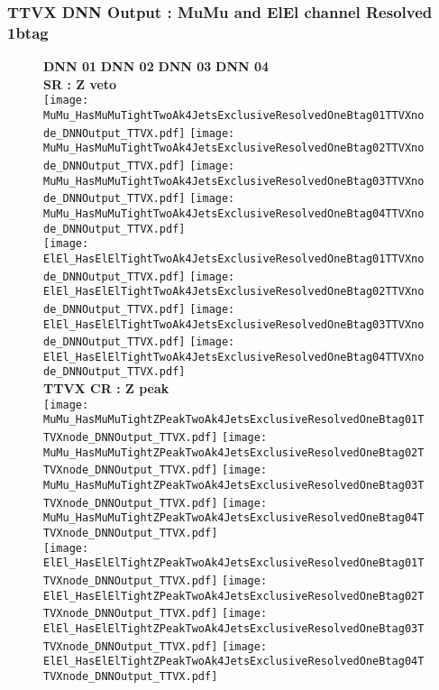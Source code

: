 \documentclass[9pt]{beamer}
\begin{document}
\begin{frame}
	\frametitle{TTVX DNN Output : MuMu and ElEl channel Resolved 1btag}
	\begin{figure}
	    \textbf{DNN 01} \hspace{1.2cm} \textbf{DNN 02} \hspace{1.2cm} \textbf{DNN 03} \hspace{1.2cm} \textbf{DNN 04} \\
        \centering
        \textbf{SR : Z veto} \\
		\texttt{[image: MuMu\_HasMuMuTightTwoAk4JetsExclusiveResolvedOneBtag01TTVXnode\_DNNOutput\_TTVX.pdf]}
		\texttt{[image: MuMu\_HasMuMuTightTwoAk4JetsExclusiveResolvedOneBtag02TTVXnode\_DNNOutput\_TTVX.pdf]}
		\texttt{[image: MuMu\_HasMuMuTightTwoAk4JetsExclusiveResolvedOneBtag03TTVXnode\_DNNOutput\_TTVX.pdf]}
		\texttt{[image: MuMu\_HasMuMuTightTwoAk4JetsExclusiveResolvedOneBtag04TTVXnode\_DNNOutput\_TTVX.pdf]}\\
		\texttt{[image: ElEl\_HasElElTightTwoAk4JetsExclusiveResolvedOneBtag01TTVXnode\_DNNOutput\_TTVX.pdf]}
		\texttt{[image: ElEl\_HasElElTightTwoAk4JetsExclusiveResolvedOneBtag02TTVXnode\_DNNOutput\_TTVX.pdf]}
		\texttt{[image: ElEl\_HasElElTightTwoAk4JetsExclusiveResolvedOneBtag03TTVXnode\_DNNOutput\_TTVX.pdf]}
		\texttt{[image: ElEl\_HasElElTightTwoAk4JetsExclusiveResolvedOneBtag04TTVXnode\_DNNOutput\_TTVX.pdf]}\\
        \textbf{TTVX CR : Z peak} \\
		\texttt{[image: MuMu\_HasMuMuTightZPeakTwoAk4JetsExclusiveResolvedOneBtag01TTVXnode\_DNNOutput\_TTVX.pdf]}
		\texttt{[image: MuMu\_HasMuMuTightZPeakTwoAk4JetsExclusiveResolvedOneBtag02TTVXnode\_DNNOutput\_TTVX.pdf]}
		\texttt{[image: MuMu\_HasMuMuTightZPeakTwoAk4JetsExclusiveResolvedOneBtag03TTVXnode\_DNNOutput\_TTVX.pdf]}
		\texttt{[image: MuMu\_HasMuMuTightZPeakTwoAk4JetsExclusiveResolvedOneBtag04TTVXnode\_DNNOutput\_TTVX.pdf]}\\
		\texttt{[image: ElEl\_HasElElTightZPeakTwoAk4JetsExclusiveResolvedOneBtag01TTVXnode\_DNNOutput\_TTVX.pdf]}
		\texttt{[image: ElEl\_HasElElTightZPeakTwoAk4JetsExclusiveResolvedOneBtag02TTVXnode\_DNNOutput\_TTVX.pdf]}
		\texttt{[image: ElEl\_HasElElTightZPeakTwoAk4JetsExclusiveResolvedOneBtag03TTVXnode\_DNNOutput\_TTVX.pdf]}
		\texttt{[image: ElEl\_HasElElTightZPeakTwoAk4JetsExclusiveResolvedOneBtag04TTVXnode\_DNNOutput\_TTVX.pdf]}\\
	\end{figure}
\end{frame}
\end{document}
